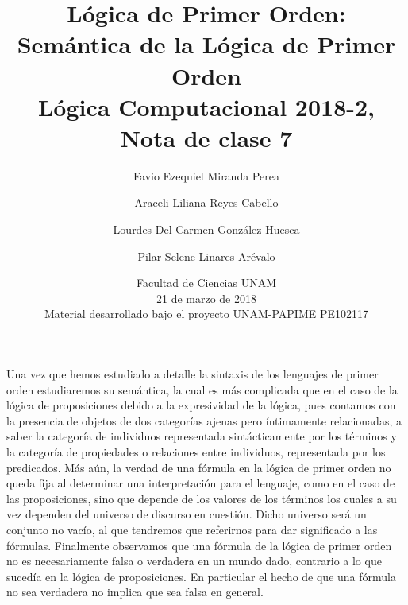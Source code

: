 \documentclass[11pt,letterpaper]{article}
\title{Lógica de Primer Orden: Semántica de la Lógica de Primer Orden \\ 
L\'ogica Computacional 2018-2, Nota de clase 7}
\author{Favio Ezequiel Miranda Perea\and Araceli Liliana Reyes Cabello\and
Lourdes Del Carmen Gonz\'alez Huesca \and Pilar Selene Linares Ar\'evalo}
\date{ Facultad de Ciencias UNAM \\ 21 de marzo de 2018 \\
Material desarrollado bajo el proyecto UNAM-PAPIME PE102117}
\begin{document}
\maketitle

Una vez que hemos estudiado a detalle la sintaxis de los lenguajes de primer
orden estudiaremos su semántica, la cual es más complicada que en
el caso de la lógica de proposiciones debido a la expresividad de la lógica, pues contamos con la presencia de objetos de
dos categorías ajenas pero íntimamente relacionadas, a saber la
categoría de individuos representada sintácticamente por los términos
y la categoría de propiedades o relaciones entre individuos,
representada por los predicados.
Más aún, la verdad de una fórmula
en la lógica de primer orden no queda fija al determinar una interpretación para el lenguaje, 
 como en el caso de las proposiciones, sino que depende de
los valores de los términos los cuales a su vez dependen del universo
de discurso en cuestión. Dicho universo 
será un conjunto no vacío, al que tendremos que referirnos para
dar significado a las fórmulas. Finalmente observamos que una fórmula
de la lógica de primer orden no es necesariamente falsa o verdadera en un
mundo  dado, contrario a lo que sucedía en la lógica de
proposiciones. En particular el hecho de que una fórmula no sea verdadera no implica que sea
falsa en general.\\



\end{document}

